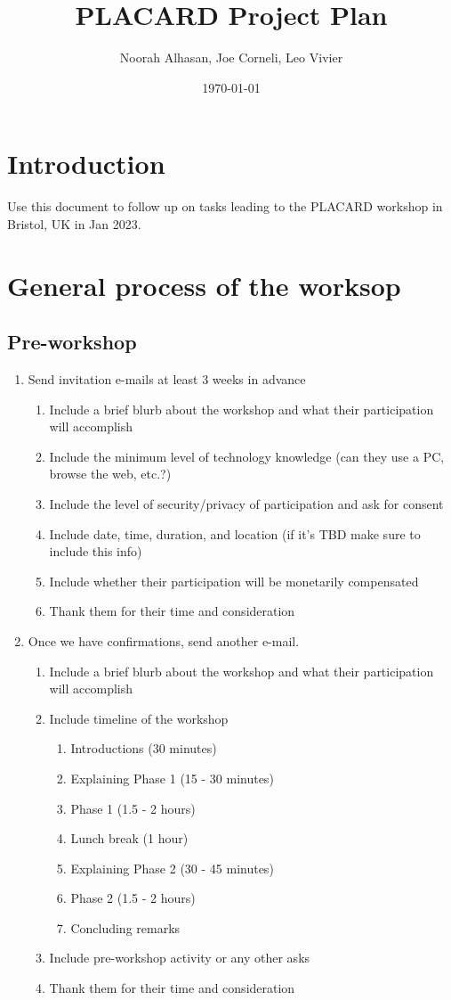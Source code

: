 \documentclass[12pt]{article}
\author{Noorah Alhasan, Joe Corneli, Leo Vivier}
\date{\today}
\title{PLACARD Project Plan}
\begin{document}
\section*{Introduction}
\label{sec:org101ade6}

Use this document to follow up on tasks leading to the PLACARD workshop in Bristol, UK in Jan 2023.

\section*{General process of the worksop}
\label{sec:org8f3f926}

\subsection*{Pre-workshop}
\label{sec:orgeb7c78a}

\begin{enumerate}
\item Send invitation e-mails at least 3 weeks in advance
\begin{enumerate}
\item Include a brief blurb about the workshop and what their participation will accomplish
\item Include the minimum level of technology knowledge (can they use a PC, browse the web, etc.?)
\item Include the level of security/privacy of participation and ask for consent
\item Include date, time, duration, and location (if it's TBD make sure to include this info)
\item Include whether their participation will be monetarily compensated
\item Thank them for their time and consideration
\end{enumerate}
\item Once we have confirmations, send another e-mail.
\begin{enumerate}
\item Include a brief blurb about the workshop and what their participation will accomplish
\item Include timeline of the workshop
\begin{enumerate}
\item Introductions (30 minutes)
\item Explaining Phase 1 (15 - 30 minutes)
\item Phase 1 (1.5 - 2 hours)
\item Lunch break (1 hour)
\item Explaining Phase 2 (30 - 45 minutes)
\item Phase 2 (1.5 - 2 hours)
\item Concluding remarks
\end{enumerate}
\item Include pre-workshop activity or any other asks
\item Thank them for their time and consideration
\end{enumerate}
\end{enumerate}
\end{document}
